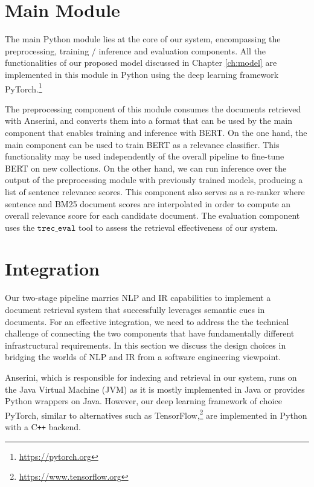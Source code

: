 \section{Main Module}

The main Python module lies at the core of our system, encompassing the preprocessing, training / inference and evaluation components.
All the functionalities of our proposed model discussed in Chapter \ref{ch:model} are implemented in this module in Python using the deep learning framework PyTorch.\footnote{\url{https://pytorch.org}}

The preprocessing component of this module consumes the documents retrieved with Anserini, and converts them into a format that can be used by the main component that enables training and inference with BERT.
On the one hand, the main component can be used to train BERT as a relevance classifier.
This functionality may be used independently of the overall pipeline to fine-tune BERT on new collections.
On the other hand, we can run inference over the output of the preprocessing module with previously trained models, producing a list of sentence relevance scores.
This component also serves as a re-ranker where sentence and BM25 document scores are interpolated in order to compute an overall relevance score for each candidate document.
The evaluation component uses the $\texttt{trec\_eval}$ tool to assess the retrieval effectiveness of our system.

\section{Integration}

Our two-stage pipeline marries NLP and IR capabilities to implement a document retrieval system that successfully leverages semantic cues in documents.
For an effective integration, we need to address the the technical challenge of connecting the two components that have fundamentally different infrastructural requirements.
In this section we discuss the design choices in bridging the worlds of NLP and IR from a software engineering viewpoint.

Anserini, which is responsible for indexing and retrieval in our system, runs on the Java Virtual Machine (JVM) as it is mostly implemented in Java or provides Python wrappers on Java.
However, our deep learning framework of choice PyTorch, similar to alternatives such as TensorFlow,\footnote{\url{https://www.tensorflow.org}} are implemented in Python with a C\texttt{++} backend.

